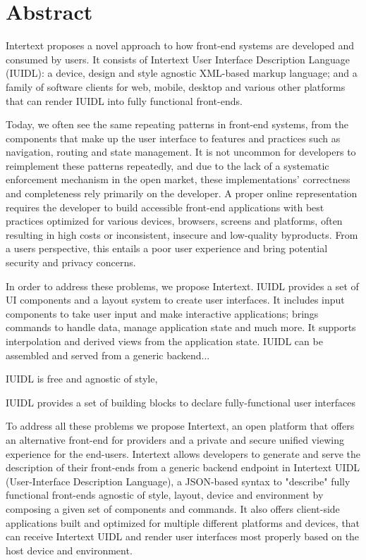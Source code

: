 

\section*{Abstract}

Intertext proposes a novel approach to how front-end systems are developed and consumed by users. It consists of Intertext User Interface Description Language (IUIDL): a device, design and style agnostic XML-based markup language; and a family of software clients for web, mobile, desktop and various other platforms that can render IUIDL into fully functional front-ends.

Today, we often see the same repeating patterns in front-end systems, from the components that make up the user interface to features and practices such as navigation, routing and state management. It is not uncommon for developers to reimplement these patterns repeatedly, and due to the lack of a systematic enforcement mechanism in the open market, these implementations' correctness and completeness rely primarily on the developer. A proper online representation requires the developer to build accessible front-end applications with best practices optimized for various devices, browsers, screens and platforms, often resulting in high costs or inconsistent, insecure and low-quality byproducts. From a users perspective, this entails a poor user experience and bring potential security and privacy concerns. 

In order to address these problems, we propose Intertext. IUIDL provides a set of UI components and a layout system to create user interfaces. It includes input components to take user input and make interactive applications; brings commands to handle data, manage application state and much more. It supports interpolation and derived views from the application state. IUIDL can be assembled and served from a generic backend...


IUIDL is free and agnostic of style,  

IUIDL provides a set of building blocks to declare fully-functional user interfaces

To address all these problems we propose Intertext, an open platform that offers an alternative front-end for providers and a private and secure unified viewing experience for the end-users. Intertext allows developers to generate and serve the description of their front-ends from a generic backend endpoint in Intertext UIDL (User-Interface Description Language), a JSON-based syntax to "describe" fully functional front-ends agnostic of style, layout, device and environment by composing a given set of components and commands. It also offers client-side applications built and optimized for multiple different platforms and devices, that can receive Intertext UIDL and render user interfaces most properly based on the host device and environment.


